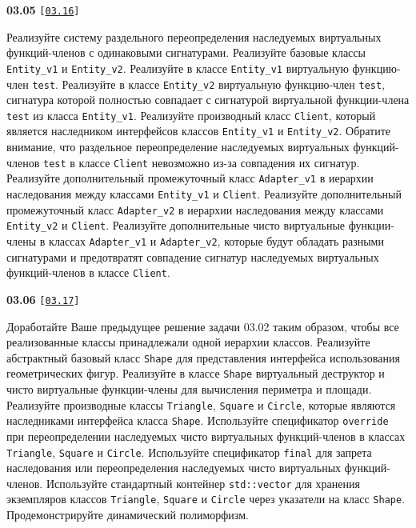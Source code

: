 \documentclass[a4paper,12pt]{article}
\begin{document}
\bigskip

{\large \textbf{03.05} \texttt{[\href{https://github.com/i-s-m-mipt/Education/blob/master/projects/examples/source/03.16.cpp}{\texttt{03.16}}]}}

\bigskip

Реализуйте систему раздельного переопределения наследуемых виртуальных функций-членов с одинаковыми сигнатурами. Реализуйте базовые классы \lstinline{Entity_v1} и \lstinline{Entity_v2}. Реализуйте в классе \lstinline{Entity_v1} виртуальную функцию-член \lstinline{test}. Реализуйте в классе \lstinline{Entity_v2} виртуальную функцию-член \lstinline{test}, сигнатура которой полностью совпадает с сигнатурой виртуальной функции-члена \lstinline{test} из класса \lstinline{Entity_v1}. Реализуйте производный класс \lstinline{Client}, который является наследником интерфейсов классов \lstinline{Entity_v1} и \lstinline{Entity_v2}. Обратите внимание, что раздельное переопределение наследуемых виртуальных функций-членов \lstinline{test} в классе \lstinline{Client} невозможно из-за совпадения их сигнатур. Реализуйте дополнительный промежуточный класс \lstinline{Adapter_v1} в иерархии наследования между классами \lstinline{Entity_v1} и \lstinline{Client}. Реализуйте дополнительный промежуточный класс \lstinline{Adapter_v2} в иерархии наследования между классами \lstinline{Entity_v2} и \lstinline{Client}. Реализуйте дополнительные чисто виртуальные функции-члены в классах \lstinline{Adapter_v1} и \lstinline{Adapter_v2}, которые будут обладать разными сигнатурами и предотвратят совпадение сигнатур наследуемых виртуальных функций-членов в классе \lstinline{Client}.

\bigskip

{\large \textbf{03.06} \texttt{[\href{https://github.com/i-s-m-mipt/Education/blob/master/projects/examples/source/03.17.cpp}{\texttt{03.17}}]}}

\bigskip

Доработайте Ваше предыдущее решение задачи 03.02 таким образом, чтобы все реализованные классы принадлежали одной иерархии классов. Реализуйте абстрактный базовый класс \lstinline{Shape} для представления интерфейса использования геометрических фигур. Реализуйте в классе \lstinline{Shape} виртуальный деструктор и чисто виртуальные функции-члены для вычисления периметра и площади. Реализуйте производные классы \lstinline{Triangle}, \lstinline{Square} и \lstinline{Circle}, которые являются наследниками интерфейса класса \lstinline{Shape}. Используйте спецификатор \lstinline{override} при переопределении наследуемых чисто виртуальных функций-членов в классах \lstinline{Triangle}, \lstinline{Square} и \lstinline{Circle}. Используйте спецификатор \lstinline{final} для запрета наследования или переопределения наследуемых чисто виртуальных функций-членов. Используйте стандартный контейнер \lstinline{std::vector} для хранения экземпляров классов \lstinline{Triangle}, \lstinline{Square} и \lstinline{Circle} через указатели на класс \lstinline{Shape}. Продемонстрируйте динамический полиморфизм.
\end{document}
